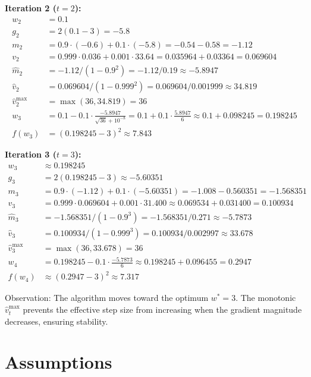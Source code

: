 \documentclass{article}
\begin{document}
\textbf{Iteration 2 ($t=2$):}
\begin{align*}
    w_2 &= 0.1 \\
    g_2 &= 2(0.1 - 3) = -5.8 \\
    m_2 &= 0.9 \cdot (-0.6) + 0.1 \cdot (-5.8) = -0.54 - 0.58 = -1.12 \\
    v_2 &= 0.999 \cdot 0.036 + 0.001 \cdot 33.64 = 0.035964 + 0.03364 = 0.069604 \\
    \hat{m}_2 &= -1.12 / (1 - 0.9^2) = -1.12 / 0.19 \approx -5.8947 \\
    \hat{v}_2 &= 0.069604 / (1 - 0.999^2) = 0.069604 / 0.001999 \approx 34.819 \\
    \hat{v}_2^{\text{max}} &= \max(36, 34.819) = 36 \\
    w_3 &= 0.1 - 0.1 \cdot \frac{-5.8947}{\sqrt{36} + 10^{-8}} = 0.1 + 0.1 \cdot \frac{5.8947}{6} \approx 0.1 + 0.098245 = 0.198245 \\
    f(w_3) &= (0.198245 - 3)^2 \approx 7.843
\end{align*}

\textbf{Iteration 3 ($t=3$):}
\begin{align*}
    w_3 &\approx 0.198245 \\
    g_3 &= 2(0.198245 - 3) \approx -5.60351 \\
    m_3 &= 0.9 \cdot (-1.12) + 0.1 \cdot (-5.60351) = -1.008 - 0.560351 = -1.568351 \\
    v_3 &= 0.999 \cdot 0.069604 + 0.001 \cdot 31.400 \approx 0.069534 + 0.031400 = 0.100934 \\
    \hat{m}_3 &= -1.568351 / (1 - 0.9^3) = -1.568351 / 0.271 \approx -5.7873 \\
    \hat{v}_3 &= 0.100934 / (1 - 0.999^3) = 0.100934 / 0.002997 \approx 33.678 \\
    \hat{v}_3^{\text{max}} &= \max(36, 33.678) = 36 \\
    w_4 &= 0.198245 - 0.1 \cdot \frac{-5.7873}{6} \approx 0.198245 + 0.096455 = 0.2947 \\
    f(w_4) &\approx (0.2947 - 3)^2 \approx 7.317
\end{align*}

Observation: The algorithm moves toward the optimum $w^*=3$. The monotonic $\hat{v}_t^{\text{max}}$ prevents the effective step size from increasing when the gradient magnitude decreases, ensuring stability.

\section*{Assumptions}
\end{document}
